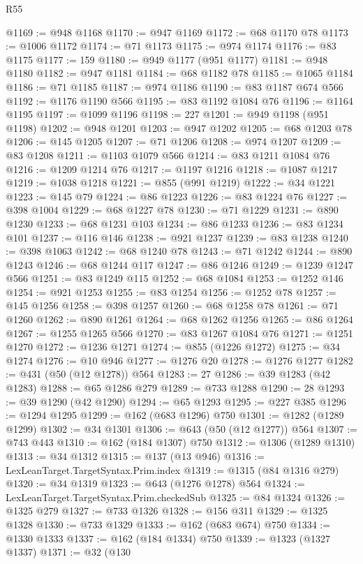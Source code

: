 \begin{lexlean}{R55}
\begin{coremodule}
{{@1169 := @948 @1168
@1170 := @947 @1169
@1172 := @68 @1170 @78
@1173 := @1006 @1172
@1174 := @71 @1173
@1175 := @974 @1174
@1176 := @83 @1175
@1177 := 159
@1180 := @949 @1177 (@951 @1177)
@1181 := @948 @1180
@1182 := @947 @1181
@1184 := @68 @1182 @78
@1185 := @1065 @1184
@1186 := @71 @1185
@1187 := @974 @1186
@1190 := @83 @1187 @674 @566
@1192 := @1176 @1190 @566
@1195 := @83 @1192 @1084 @76
@1196 := @1164 @1195
@1197 := @1099 @1196
@1198 := 227
@1201 := @949 @1198 (@951 @1198)
@1202 := @948 @1201
@1203 := @947 @1202
@1205 := @68 @1203 @78
@1206 := @145 @1205
@1207 := @71 @1206
@1208 := @974 @1207
@1209 := @83 @1208
@1211 := @1103 @1079 @566
@1214 := @83 @1211 @1084 @76
@1216 := @1209 @1214 @76
@1217 := @1197 @1216
@1218 := @1087 @1217
@1219 := @1038 @1218
@1221 := @855 (@991 @1219)
@1222 := @34 @1221
@1223 := @145 @79
@1224 := @86 @1223
@1226 := @83 @1224 @76
@1227 := @398 @1004
@1229 := @68 @1227 @78
@1230 := @71 @1229
@1231 := @890 @1230
@1233 := @68 @1231 @103
@1234 := @86 @1233
@1236 := @83 @1234 @101
@1237 := @116 @146
@1238 := @921 @1237
@1239 := @83 @1238
@1240 := @398 @1063
@1242 := @68 @1240 @78
@1243 := @71 @1242
@1244 := @890 @1243
@1246 := @68 @1244 @117
@1247 := @86 @1246
@1249 := @1239 @1247 @566
@1251 := @83 @1249 @115
@1252 := @68 @1084
@1253 := @1252 @146
@1254 := @921 @1253
@1255 := @83 @1254
@1256 := @1252 @78
@1257 := @145 @1256
@1258 := @398 @1257
@1260 := @68 @1258 @78
@1261 := @71 @1260
@1262 := @890 @1261
@1264 := @68 @1262 @1256
@1265 := @86 @1264
@1267 := @1255 @1265 @566
@1270 := @83 @1267 @1084 @76
@1271 := @1251 @1270
@1272 := @1236 @1271
@1274 := @855 (@1226 @1272)
@1275 := @34 @1274
@1276 := @10 @946
@1277 := @1276 @20
@1278 := @1276 @1277
@1282 := @431 (@50 (@12 @1278)) @564
@1283 := 27
@1286 := @39 @1283 (@42 @1283)
@1288 := @65 @1286 @279
@1289 := @733 @1288
@1290 := 28
@1293 := @39 @1290 (@42 @1290)
@1294 := @65 @1293
@1295 := @227 @385
@1296 := @1294 @1295
@1299 := @162 (@683 @1296) @750
@1301 := @1282 (@1289 @1299)
@1302 := @34 @1301
@1306 := @643 (@50 (@12 @1277)) @564
@1307 := @743 @443
@1310 := @162 (@184 @1307) @750
@1312 := @1306 (@1289 @1310)
@1313 := @34 @1312
@1315 := @137 (@13 @946)
@1316 := LexLeanTarget.TargetSyntax.Prim.index
@1319 := @1315 (@84 @1316 @279)
@1320 := @34 @1319
@1323 := @643 (@1276 @1278) @564
@1324 := LexLeanTarget.TargetSyntax.Prim.checkedSub
@1325 := @84 @1324
@1326 := @1325 @279
@1327 := @733 @1326
@1328 := @156 @311
@1329 := @1325 @1328
@1330 := @733 @1329
@1333 := @162 (@683 @674) @750
@1334 := @1330 @1333
@1337 := @162 (@184 @1334) @750
@1339 := @1323 (@1327 @1337)
@1371 := @32
    (@130
}}
\end{coremodule}
\end{lexlean}

